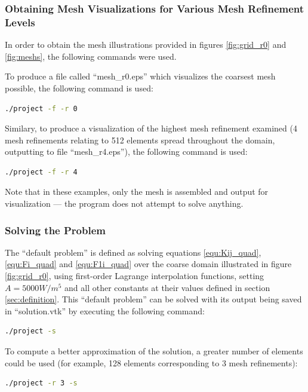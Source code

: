 \documentclass[letterpaper,10pt]{article}
\begin{document}
\subsubsection{Obtaining Mesh Visualizations for Various Mesh Refinement Levels}
In order to obtain the mesh illustrations provided in figures \ref{fig:grid_r0} and \ref{fig:meshs}, the following commands were used.

To produce a file called ``mesh\_r0.eps'' which visualizes the coarsest mesh possible, the following command is used:
\vspace{-6mm}
\begin{lstlisting}[numbers=none,frame=none,language=bash]
./project -f -r 0
\end{lstlisting}
\vspace{1mm}

Similary, to produce a visualization of the highest mesh refinement examined (4 mesh refinements relating to 512 elements spread throughout the domain, outputting to file ``mesh\_r4.eps''), the following command is used:
\vspace{-6mm}
\begin{lstlisting}[numbers=none,frame=none,language=bash]
./project -f -r 4
\end{lstlisting}
\vspace{1mm}

Note that in these examples, only the mesh is assembled and output for visualization --- the program does not attempt to solve anything.

\subsubsection{Solving the Problem}
The ``default problem'' is defined as solving equations \ref{equ:Kij_quad}, \ref{equ:Fi_quad} and \ref{equ:F1i_quad} over the coarse domain illustrated in figure \ref{fig:grid_r0}, using first-order Lagrange interpolation functions, setting $A=\unit{5000}{W/m^5}$ and all other constants at their values defined in section \ref{sec:definition}. This ``default problem'' can be solved with its output being saved in ``solution.vtk'' by executing the following command:
\vspace{-6mm}
\begin{lstlisting}[numbers=none,frame=none,language=bash]
./project -s
\end{lstlisting}
\vspace{1mm}

To compute a better approximation of the solution, a greater number of elements could be used (for example, 128 elements corresponding to 3 mesh refinements):
\vspace{-6mm}
\begin{lstlisting}[numbers=none,frame=none,language=bash]
./project -r 3 -s
\end{lstlisting}
\vspace{1mm}
\end{document}
